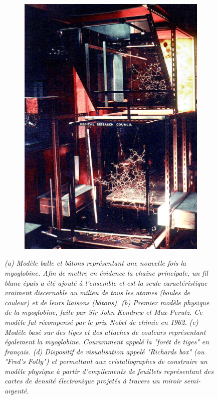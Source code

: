 \begin{figure}
\begin{subfigure}{.5\textwidth}
  {\includegraphics[width=0.9\linewidth]{./figures/ch1/fred_richards_ribonuclease}}
  \caption{}
  \label{Fig:fred_richards_ribonuclease}
  \hspace{0.2cm}
  \end{subfigure}%
  \caption{\it (a) Modèle balle et bâtons représentant une nouvelle fois la myoglobine. Afin de mettre en évidence la chaîne principale, un fil blanc épais a été ajouté à l'ensemble et est la seule caractéristique vraiment discernable au milieu de tous les atomes (boules de couleur) et de leurs liaisons (bâtons).
  (b) Premier modèle physique de la myoglobine, faite par Sir John Kendrew et Max Perutz. Ce modèle fut récompensé par le prix Nobel de chimie en 1962.
  (c) Modèle basé sur des tiges et des attaches de couleurs représentant également la myoglobine. Couramment appelé la "forêt de tiges" en français.  
  (d) Dispositif de visualisation appelé "Richards box" (ou "Fred's Folly") et permettant aux cristallographes de construire un modèle physique à partir d'empilements de feuillets représentant des cartes de densité électronique projetés à travers un miroir semi-argenté.}
\end{figure}

